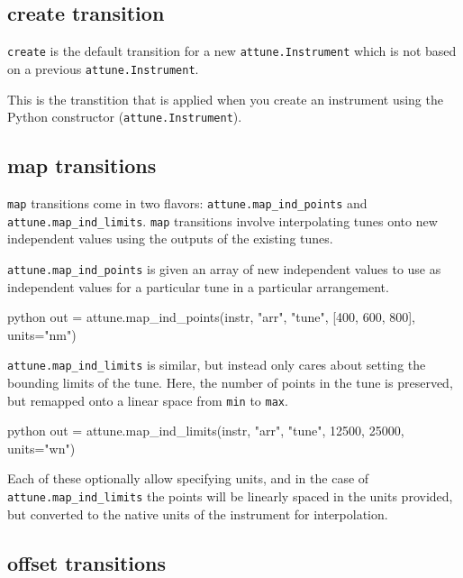 \hypertarget{create-transition}{%
\subsection{create transition}\label{create-transition}}

\texttt{create} is the default transition for a new
\texttt{attune.Instrument} which is not based on a
previous \texttt{attune.Instrument}.

This is the transtition that is applied when you create an instrument using the Python
constructor (\texttt{attune.Instrument}).

\hypertarget{map-transitions}{%
\subsection{map transitions}\label{map-transitions}}

\texttt{map} transitions come in two flavors:
\texttt{attune.map\_ind\_points} and \texttt{attune.map\_ind\_limits}.
\texttt{map} transitions involve interpolating tunes onto new
independent values using the outputs of the existing tunes.

\texttt{attune.map\_ind\_points} is given an array of new independent
values to use as independent values for a particular tune in a
particular arrangement.

\begin{codefragment}{python}
out = attune.map_ind_points(instr, "arr", "tune", [400, 600, 800], units="nm")
\end{codefragment}

\texttt{attune.map\_ind\_limits} is similar, but instead only cares
about setting the bounding limits of the tune. Here, the number of
points in the tune is preserved, but remapped onto a linear space from
\texttt{min} to \texttt{max}.

\begin{codefragment}{python}
out = attune.map_ind_limits(instr, "arr", "tune", 12500, 25000, units="wn")
\end{codefragment}

Each of these optionally allow specifying units, and in the case of
\texttt{attune.map\_ind\_limits} the points will be linearly spaced in
the units provided, but converted to the native units of the instrument
for interpolation.

\hypertarget{offset-transitions}{%
\subsection{offset transitions}\label{offset-transitions}}

